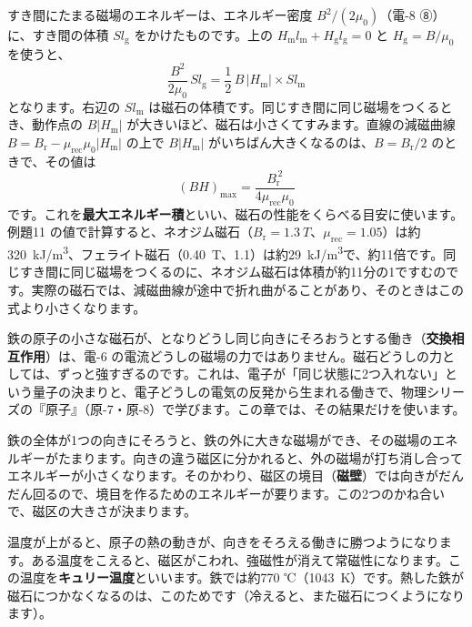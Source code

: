 \begin{motto}[5]
すき間にたまる磁場のエネルギーは、エネルギー密度 $B^2/(2\mu_0)$（電-8 ⑧）に、すき間の体積 $Sl_{\mathrm g}$ をかけたものです。上の $H_{\mathrm m}l_{\mathrm m}+H_{\mathrm g}l_{\mathrm g}=0$ と $H_{\mathrm g}=B/\mu_0$ を使うと、
\[\frac{B^2}{2\mu_0}\,Sl_{\mathrm g}=\frac12\,B\,|H_{\mathrm m}|\times Sl_{\mathrm m}\]
となります。右辺の $Sl_{\mathrm m}$ は磁石の体積です。同じすき間に同じ磁場をつくるとき、動作点の $B|H_{\mathrm m}|$ が大きいほど、磁石は小さくてすみます。直線の減磁曲線 $B=B_{\mathrm r}-\mu_{\mathrm{rec}}\mu_0|H_{\mathrm m}|$ の上で $B|H_{\mathrm m}|$ がいちばん大きくなるのは、$B=B_{\mathrm r}/2$ のときで、その値は
\[(BH)_{\max}=\frac{B_{\mathrm r}^{\,2}}{4\mu_{\mathrm{rec}}\mu_0}\]
です。これを\textbf{最大エネルギー積}といい、磁石の性能をくらべる目安に使います。例題11 の値で計算すると、ネオジム磁石（$B_{\mathrm r}=\qty{1.3}{T}$、$\mu_{\mathrm{rec}}=1.05$）は約\qty{320}{kJ/m^3}、フェライト磁石（\qty{0.40}{T}、1.1）は約\qty{29}{kJ/m^3}で、約11倍です。同じすき間に同じ磁場をつくるのに、ネオジム磁石は体積が約11分の1ですむのです。実際の磁石では、減磁曲線が途中で折れ曲がることがあり、そのときはこの式より小さくなります。
\end{motto}

\label{ph:電-7:sec10}
鉄の原子の小さな磁石が、となりどうし同じ向きにそろおうとする働き（\textbf{交換相互作用}）は、電-6 の電流どうしの磁場の力ではありません。磁石どうしの力としては、ずっと強すぎるのです。これは、電子が「同じ状態に2つ入れない」という量子の決まりと、電子どうしの電気の反発から生まれる働きで、物理シリーズの『原子』（原-7・原-8）で学びます。この章では、その結果だけを使います。

鉄の全体が1つの向きにそろうと、鉄の外に大きな磁場ができ、その磁場のエネルギーがたまります。向きの違う磁区に分かれると、外の磁場が打ち消し合ってエネルギーが小さくなります。そのかわり、磁区の境目（\textbf{磁壁}）では向きがだんだん回るので、境目を作るためのエネルギーが要ります。この2つのかね合いで、磁区の大きさが決まります。

温度が上がると、原子の熱の動きが、向きをそろえる働きに勝つようになります。ある温度をこえると、磁区がこわれ、強磁性が消えて常磁性になります。この温度を\textbf{キュリー温度}といいます。鉄では約770 ℃（\qty{1043}{K}）です。熱した鉄が磁石につかなくなるのは、このためです（冷えると、また磁石につくようになります）。

